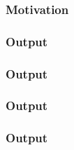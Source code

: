   \begin{frame}
    \frametitle{Motivation}
    \begin{center}
        \fontsize{50}{50}\selectfont{Random Sampling}
    \end{center}
  \end{frame}

  \begin{frame}
    \frametitle{Output}
    \centering
    
  \end{frame}

  \begin{frame}
    \frametitle{Output}
    \centering
    
  \end{frame}

  \begin{frame}
    \frametitle{Output}
    \centering
    
  \end{frame}

  \begin{frame}
    \frametitle{Output}
    \centering
    
  \end{frame}


